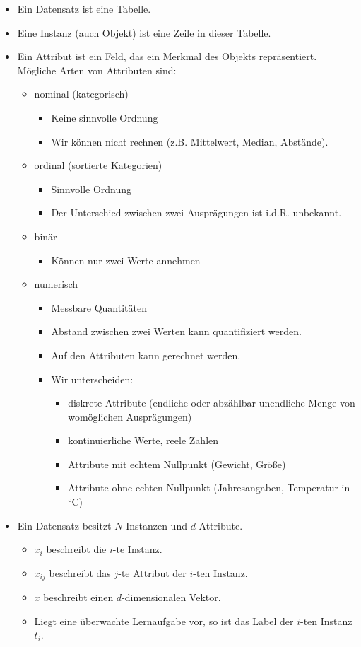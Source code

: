 \documentclass{scrartcl}
\begin{document}
\begin{itemize}
	\item Ein Datensatz ist eine Tabelle.
	\item Eine Instanz (auch Objekt) ist eine Zeile in dieser Tabelle.
	\item Ein Attribut ist ein Feld, das ein Merkmal des Objekts repräsentiert. 
	Mögliche Arten von Attributen sind:
	\begin{itemize}
		\item nominal (kategorisch)
		\begin{itemize}
			\item Keine sinnvolle Ordnung
			\item Wir können nicht rechnen (z.B. Mittelwert, Median, Abstände).
		\end{itemize}
		\item ordinal (sortierte Kategorien)
		\begin{itemize}
			\item Sinnvolle Ordnung
			\item Der Unterschied zwischen zwei Ausprägungen ist i.d.R. 
			unbekannt.
		\end{itemize}
		\item binär
		\begin{itemize}
			\item Können nur zwei Werte annehmen
		\end{itemize}
		\item numerisch
		\begin{itemize}
			\item Messbare Quantitäten
			\item Abstand zwischen zwei Werten kann quantifiziert werden.
			\item Auf den Attributen kann gerechnet werden.
			\item Wir unterscheiden:
			\begin{itemize}
				\item diskrete Attribute (endliche oder abzählbar unendliche 
				Menge von womöglichen Ausprägungen)
				\item kontinuierliche Werte, reele Zahlen
				\item Attribute mit echtem Nullpunkt (Gewicht, Größe)
				\item Attribute ohne echten Nullpunkt (Jahresangaben, 
				Temperatur in °C)
			\end{itemize}
		\end{itemize}
	\end{itemize}
	\item Ein Datensatz besitzt $ N $ Instanzen und $ d $ Attribute.
	\begin{itemize}
		\item $ x_i $ beschreibt die $ i $-te Instanz.
		\item $ x_{ij} $ beschreibt das $ j $-te Attribut der $ i $-ten Instanz.
		\item $ x $ beschreibt einen $ d $-dimensionalen Vektor.
		\item Liegt eine überwachte Lernaufgabe vor, so ist das Label der $ i 
		$-ten Instanz $ t_i $.
	\end{itemize}
\end{itemize}
\end{document}
